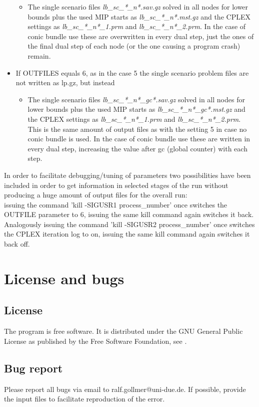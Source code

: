 \documentclass[11pt,draft]{article}
\newcommand{\+}{{\ti{+}}}
\newcommand{\1}{{\ti{1}}}
\begin{document}
\begin{itemize}
\begin{itemize}
\item The single scenario files {\it lb\_sc\_*\_n*.sav.gz} solved in all nodes for lower bounds plus the used MIP starts as {\it lb\_sc\_*\_n*.mst.gz} and
 the CPLEX settings as {\it lb\_sc\_*\_n*\_1.prm} and {\it lb\_sc\_*\_n*\_2.prm}. In the case of conic bundle use these are overwritten in every dual step,
 just the ones of the final dual step of each node (or the one causing a program crash) remain.
\end{itemize}
\item If OUTFILES equals 6, as in the case 5 the single scenario problem files are not written as lp.gz, but instead
\begin{itemize}
\item The single scenario files {\it lb\_sc\_*\_n*\_gc*.sav.gz} solved in all nodes for lower bounds plus the used MIP starts as {\it lb\_sc\_*\_n*\_gc*.mst.gz} and
 the CPLEX settings as {\it lb\_sc\_*\_n*\_1.prm} and {\it lb\_sc\_*\_n*\_2.prm}.
 This is the same amount of output files as with the setting 5 in case no conic bundle is used.
 In the case of conic bundle use these are written in every dual step, increasing the value after gc (global counter) with each step.
\end{itemize}
\end{itemize}
In order to facilitate debugging/tuning of parameters two possibilities have been included in order to get information in selected stages of the
run without producing a huge amount of output files for the overall run:\\
issuing the command 'kill -SIGUSR1 process\_number' once switches the OUTFILE parameter to 6, issuing the same kill command again switches it back.
Analogously issuing the command 'kill -SIGUSR2 process\_number' once switches the CPLEX iteration log to on, issuing the same kill command again switches it back off.
%
\section{License and bugs}
\subsection{License}
The program is free software. It is distributed under the GNU General Public License as published by
the Free Software Foundation, see \cite{gnu}.
%
\subsection{Bug report}
Please report all bugs via email to ralf.gollmer@uni-due.de. If possible, provide the input
files to facilitate reproduction of the error.
%
\end{document}

